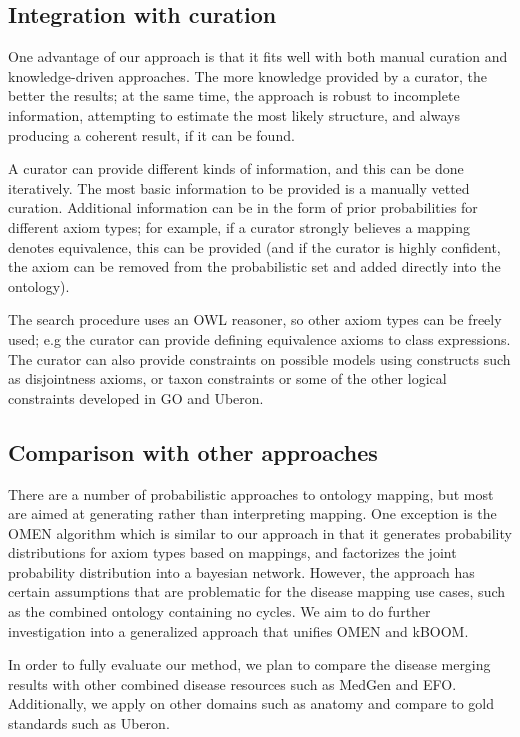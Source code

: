 \documentclass{my}
\begin{document}
\subsection{Integration with curation}

One advantage of our approach is that it fits well with both manual
curation and knowledge-driven approaches. The more knowledge provided
by a curator, the better the results; at the same time, the approach
is robust to incomplete information, attempting to estimate the most
likely structure, and always producing a coherent result, if it can be
found.

A curator can provide different kinds of information, and this can be
done iteratively. The most basic information to be provided is a
manually vetted curation. Additional information can be in the form of
prior probabilities for different axiom types; for example, if a
curator strongly believes a mapping denotes equivalence, this can be
provided (and if the curator is highly confident, the axiom can be
removed from the probabilistic set and added directly into the
ontology).

The search procedure uses an OWL reasoner, so other axiom types can be
freely used; e.g the curator can provide defining equivalence axioms
to class expressions. The curator can also provide constraints on
possible models using constructs such as disjointness axioms, or taxon
constraints or some of the other logical constraints developed in
GO\cite{Mungall2014} and Uberon.

\subsection{Comparison with other approaches}

There are a number of probabilistic approaches to ontology mapping,
but most are aimed at generating rather than interpreting mapping. One
exception is the OMEN algorithm\cite{Mitra2005} which is similar to
our approach in that it generates probability distributions for axiom
types based on mappings, and factorizes the joint probability
distribution into a bayesian network. However, the approach has
certain assumptions that are problematic for the disease mapping use
cases, such as the combined ontology containing no cycles. We aim to
do further investigation into a generalized approach that unifies OMEN
and kBOOM.

In order to fully evaluate our method, we plan to compare the disease
merging results with other combined disease resources such as MedGen
and EFO\cite{malone2010modeling}. Additionally, we apply on other
domains such as anatomy and compare to gold standards such as Uberon.
\end{document}
